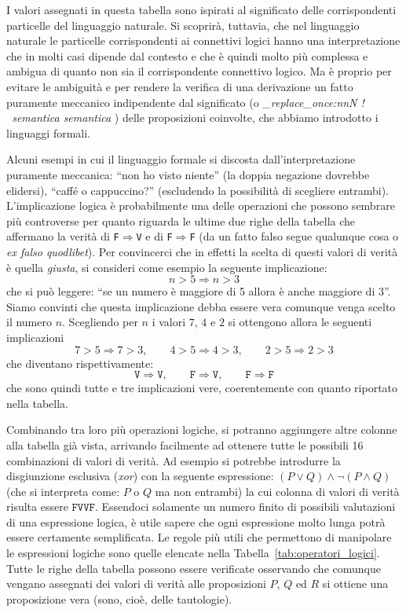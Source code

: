 \documentclass[italian,a4paper,twosides,headinclude]{scrbook}
\newcommand\stripExclamation[1]{
\def\tmp{#1}
\regex_replace_once:nnN { ! } { \  }\tmp
\tmp}
\newcommand{\mynote}[1]{\marginnote{{\footnotesize\stripExclamation{#1}}}}
\newcommand{\myemph}[2][]{%
  \emph{\stripExclamation{#2}}%
  \ifthenelse{\isempty{#1}}%
    {\mynote{#2}%
    \index{#2}}%
    {\mynote{#2}%
     \ifthenelse{\isempty{}}%
      {\index{#2}}%
      {\index{}}}}%
\begin{document}
I valori assegnati in questa tabella sono ispirati al significato
delle corrispondenti particelle del linguaggio naturale. Si scoprirà,
tuttavia, che nel linguaggio naturale le particelle corrispondenti ai
connettivi logici hanno una interpretazione che in molti casi dipende
dal contesto e che è quindi molto più complessa e ambigua di quanto
non sia il corrispondente connettivo logico. Ma è proprio per evitare
le ambiguità e per rendere la verifica di una derivazione un fatto
puramente meccanico indipendente dal significato (o \myemph{semantica})
delle proposizioni coinvolte, che abbiamo introdotto i linguaggi
formali.

Alcuni esempi in cui il linguaggio formale si discosta
dall'interpretazione puramente meccanica: ``non ho visto niente''
(la doppia negazione dovrebbe elidersi), ``caffé o cappuccino?''
(escludendo la possibilità di scegliere entrambi). L'implicazione
logica è probabilmente una delle operazioni che possono sembrare più
controverse per quanto riguarda le ultime due righe della tabella che
affermano la verità di \texttt{F}$\Rightarrow$\texttt{V} e di
\texttt{F}$\Rightarrow$\texttt{F} (da un fatto falso segue qualunque
cosa o \emph{ex falso quodlibet}). Per convincerci che in effetti la
scelta di questi valori di verità è quella \emph{giusta}, si consideri
come esempio
la seguente implicazione:
\[
n > 5 \Rightarrow n > 3
\]
che si può leggere: ``se un numero è maggiore di 5 allora è anche
maggiore di 3''. Siamo convinti che questa implicazione debba essere vera comunque
venga scelto il numero $n$. Scegliendo per $n$ i valori $7$, $4$ e $2$
si ottengono allora le seguenti implicazioni
\[
7 > 5 \Rightarrow 7>3, \qquad 4>5 \Rightarrow 4 > 3, \qquad 2>5
\Rightarrow 2>3
\]
che diventano rispettivamente:
\[
\texttt{V} \Rightarrow \texttt{V}, \qquad
\texttt{F} \Rightarrow \texttt{V}, \qquad
\texttt{F} \Rightarrow \texttt{F}
\]
che sono quindi tutte e tre implicazioni vere, coerentemente con
quanto riportato nella tabella.

Combinando tra loro più operazioni logiche, si potranno
aggiungere altre colonne alla tabella già vista, arrivando facilmente
ad ottenere tutte le possibili 16 combinazioni di valori di verità. Ad
esempio si potrebbe introdurre la disgiunzione esclusiva (\emph{xor})
con la seguente espressione: $(P \lor Q) \land \neg (P\land Q)$ (che
si interpreta come: $P$ o $Q$ ma non entrambi) la cui colonna di
valori di verità risulta essere $\texttt{FVVF}$. Essendoci solamente
un numero finito di possibili valutazioni di una espressione logica, è
utile sapere che ogni espressione molto lunga potrà essere certamente
semplificata. Le regole più utili che permettono di manipolare le
espressioni logiche sono quelle elencate nella Tabella~\ref{tab:operatori_logici}.
Tutte le righe della tabella possono essere verificate
osservando che comunque vengano assegnati dei valori di verità alle proposizioni
$P$, $Q$ ed $R$ si ottiene una proposizione vera (sono, cioè, delle tautologie).
\end{document}
